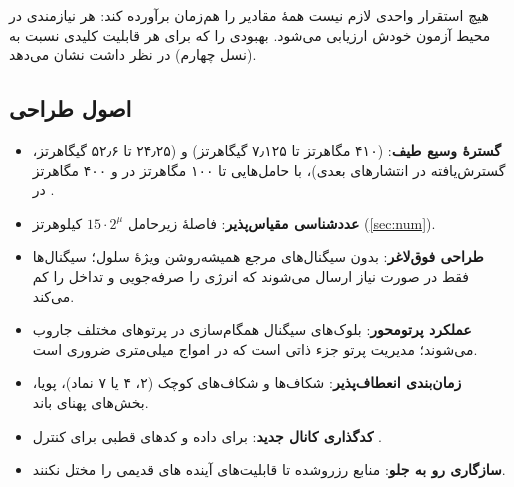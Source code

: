 \documentclass[11pt,a4paper]{article}
\begin{document}
هیچ استقرار واحدی لازم نیست همهٔ مقادیر را هم‌زمان برآورده کند: هر نیازمندی در محیط آزمون خودش ارزیابی می‌شود.
 بهبودی را که  برای هر قابلیت کلیدی نسبت به  (نسل چهارم) در نظر داشت
نشان می‌دهد.

\begin{acnfigure}
  \caption{ضرایب بهبود قابلیت‌های کلیدی  نسبت به ، مطابق تصویر 
           \cite{itu2015m2083}. تأخیر به‌صورت معکوس نشان داده شده است.}
  \label{fig:capabilities}
\end{acnfigure}

\subsection{اصول طراحی }
\begin{itemize}
  \item \textbf{گسترهٔ وسیع طیف}:  (۴۱۰ مگاهرتز تا ۷٫۱۲۵ گیگاهرتز) و  (۲۴٫۲۵ تا ۵۲٫۶ گیگاهرتز، گسترش‌یافته در
        انتشارهای بعدی)، با حامل‌هایی تا ۱۰۰ مگاهرتز در  و ۴۰۰ مگاهرتز در  \cite{ts38300}.
  \item \textbf{عددشناسی مقیاس‌پذیر}: فاصلهٔ زیرحامل $15\cdot2^\mu$ کیلوهرتز (\cref{sec:num}).
  \item \textbf{طراحی فوق‌لاغر}: بدون سیگنال‌های مرجع همیشه‌روشن ویژهٔ سلول؛ سیگنال‌ها فقط در صورت نیاز ارسال می‌شوند که
        انرژی را صرفه‌جویی و تداخل را کم می‌کند.
  \item \textbf{عملکرد پرتومحور}: بلوک‌های سیگنال همگام‌سازی در پرتوهای مختلف جاروب می‌شوند؛ مدیریت پرتو جزء ذاتی است که
        در امواج میلی‌متری ضروری است.
  \item \textbf{زمان‌بندی انعطاف‌پذیر}: شکاف‌ها و شکاف‌های کوچک (۲، ۴ یا ۷ نماد)،  پویا، بخش‌های پهنای باند.
  \item \textbf{کدگذاری کانال جدید}:  برای داده و کدهای قطبی برای کنترل \cite{ts38211}.
  \item \textbf{سازگاری رو به جلو}: منابع رزروشده تا قابلیت‌های آینده های قدیمی را مختل نکنند.
\end{itemize}
\end{document}
